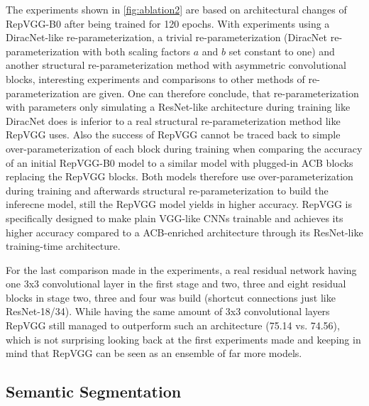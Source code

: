 The experiments shown in \autoref{fig:ablation2} are based on architectural changes of RepVGG-B0 after being trained for 120 epochs. With experiments using a DiracNet-like re-parameterization, a trivial re-parameterization (DiracNet re-parameterization with both scaling factors $a$ and $b$ set constant to one) and another structural re-parameterization method with asymmetric convolutional blocks, interesting experiments and comparisons to other methods of re-parameterization are given. One can therefore conclude, that re-parameterization with parameters only simulating a ResNet-like architecture during training like DiracNet does is inferior to a real structural re-parameterization method like RepVGG uses. Also the success of RepVGG cannot be traced back to simple over-parameterization of each block during training when comparing the accuracy of an initial RepVGG-B0 model to a similar model with plugged-in ACB blocks replacing the RepVGG blocks. Both models therefore use over-parameterization during training and afterwards structural re-parameterization to build the inferecne model, still the RepVGG model yields in higher accuracy. RepVGG is specifically designed to make plain VGG-like CNNs trainable and achieves its higher accuracy compared to a ACB-enriched architecture through its ResNet-like training-time architecture. 

For the last comparison made in the experiments, a real residual network having one 3x3 convolutional layer in the first stage and two, three and eight residual blocks in stage two, three and four was build (shortcut connections just like ResNet-18/34). While having the same amount of 3x3 convolutional layers RepVGG still managed to outperform such an architecture (75.14 vs. 74.56), which is not surprising looking back at the first experiments made and keeping in mind that RepVGG can be seen as an ensemble of far more models. 

\subsection{Semantic Segmentation}
